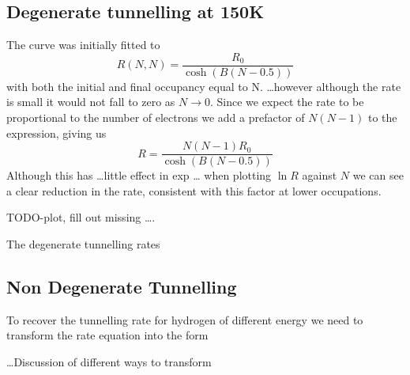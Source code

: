 \subsection{Degenerate tunnelling at 150K}


The curve was initially fitted to
\begin{equation}
    R(N, N) = \frac{R_0}{\cosh{(B(N - 0.5))}}
\end{equation}
with both the initial and final occupancy
equal to N. \ldots however although the rate is small it
would not fall to zero as \(N \rightarrow 0\).
Since we expect the rate to be proportional to the
number of electrons we add a prefactor of \(N(N-1)\)
to the expression, giving us
\begin{equation}
    R = \frac{N(N-1) R_0}{\cosh{(B(N - 0.5))}}
\end{equation}
Although this has \ldots little effect in exp \ldots
when plotting \(\ln{R}\) against \(N\) we can see a
clear reduction in the rate, consistent with this factor
at lower occupations.

TODO-plot, fill out missing \ldots.

The degenerate tunnelling rates

\subsection{Non Degenerate Tunnelling}
To recover the tunnelling rate for hydrogen of different
energy we need to transform the rate equation
into the form

\ldots Discussion of different ways to transform



